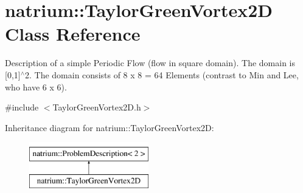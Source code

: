 \hypertarget{classnatrium_1_1TaylorGreenVortex2D}{\section{natrium\-:\-:Taylor\-Green\-Vortex2\-D Class Reference}
\label{classnatrium_1_1TaylorGreenVortex2D}
}


Description of a simple Periodic Flow (flow in square domain). The domain is \mbox{[}0,1\mbox{]}$^\wedge$2. The domain consists of 8 x 8 = 64 Elements (contrast to Min and Lee, who have 6 x 6).  




{\ttfamily \#include $<$Taylor\-Green\-Vortex2\-D.\-h$>$}

Inheritance diagram for natrium\-:\-:Taylor\-Green\-Vortex2\-D\-:\begin{figure}[H]
\begin{center}
\leavevmode
\includegraphics[height=2.000000cm]{classnatrium_1_1TaylorGreenVortex2D}
\end{center}
\end{figure}
